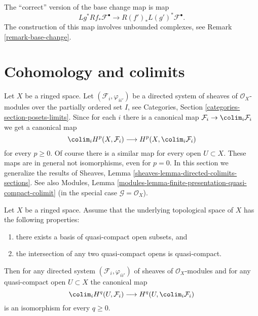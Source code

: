 \begin{remark}
\label{remark-correct-version-base-change-map}
The ``correct'' version of the base change map is map
$$
Lg^* Rf_* \mathcal{F}^\bullet
\longrightarrow
R(f')_* L(g')^*\mathcal{F}^\bullet.
$$
The construction of this map involves
unbounded complexes, see Remark \ref{remark-base-change}.
\end{remark}



\section{Cohomology and colimits}
\label{section-limits}

\noindent
Let $X$ be a ringed space. Let $(\mathcal{F}_i, \varphi_{ii'})$
be a directed system of sheaves of $\mathcal{O}_X$-modules
over the partially ordered set $I$, see
Categories, Section \ref{categories-section-posets-limits}.
Since for each $i$ there is a canonical map
$\mathcal{F}_i \to \colim_i \mathcal{F}_i$ we get a
canonical map
$$
\colim_i H^p(X, \mathcal{F}_i)
\longrightarrow
H^p(X, \colim_i \mathcal{F}_i)
$$
for every $p \geq 0$. Of course there is a similar map for
every open $U \subset X$. These maps are in general not isomorphisms,
even for $p = 0$. In this section we generalize the results of
Sheaves, Lemma \ref{sheaves-lemma-directed-colimits-sections}.
See also
Modules, Lemma \ref{modules-lemma-finite-presentation-quasi-compact-colimit}
(in the special case $\mathcal{G} = \mathcal{O}_X$).

\begin{lemma}
\label{lemma-quasi-separated-cohomology-colimit}
Let $X$ be a ringed space. Assume that the underlying topological space
of $X$ has the following properties:
\begin{enumerate}
\item there exists a basis of quasi-compact open subsets, and
\item the intersection of any two quasi-compact opens is quasi-compact.
\end{enumerate}
Then for any directed system $(\mathcal{F}_i, \varphi_{ii'})$
of sheaves of $\mathcal{O}_X$-modules and for any quasi-compact open
$U \subset X$ the canonical map
$$
\colim_i H^q(U, \mathcal{F}_i)
\longrightarrow
H^q(U, \colim_i \mathcal{F}_i)
$$
is an isomorphism for every $q \geq 0$.
\end{lemma}

